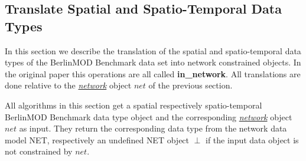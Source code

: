 \documentclass[a4paper]{article}
\newcommand{\bmodb} {BerlinMOD Benchmark}
\newcommand{\op}[1]{\textbf{#1}}
\newcommand{\dt}[1]{\textsl{\underline{#1}}}
\begin{document}
\subsection{Translate Spatial and Spatio-Temporal Data Types}
\label{sec:translateSTdata}
In this section we describe the translation of the spatial and spatio-temporal
data types of the \bmodb{} data set into network constrained
objects. In the original paper this operations are all called \op{in\_network}.
All translations are done relative to the \dt{network} object $net$ of the
previous section.

All algorithms in this section get a spatial respectively spatio-temporal
\bmodb{}
data type object and the corresponding \dt{network} object $net$ as input.
They return the corresponding data type from the network data model NET,
respectively an undefined NET object $\perp$ if the input data object is not
constrained by $net$.
\end{document}
